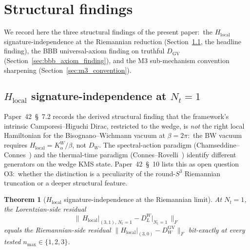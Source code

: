\documentclass[11pt,a4paper]{article}
\theoremstyle{plain}
\newtheorem{theorem}{Theorem}[section]
\theoremstyle{definition}
\newcommand{\nmax}{n_{\max}}
\newcommand{\Nt}{N_t}
\newcommand{\sthree}{S^{3}}
\newcommand{\Frob}[1]{\lVert #1 \rVert_{F}}
\newcommand{\DGV}{D_{\mathrm{GV}}}
\newcommand{\DL}{D_{L}}
\begin{document}
\section{Structural findings}\label{sec:structural_findings}

We record here the three structural findings of the present paper:\
the $H_{\mathrm{local}}$ signature-independence at the Riemannian
reduction (Section~\ref{sec:H_local_signature_independence}, the
headline finding), the BBB universal-axiom finding on truthful $\DGV$
(Section~\ref{sec:bbb_axiom_finding}), and the M3 sub-mechanism
convention sharpening
(Section~\ref{sec:m3_convention}).

\subsection{$H_{\mathrm{local}}$ signature-independence at $\Nt = 1$}
\label{sec:H_local_signature_independence}

Paper~42~\S~7.2 records the derived structural finding that the
framework's intrinsic Camporesi--Higuchi Dirac, restricted to the
wedge, is \emph{not} the right local Hamiltonian for the
Bisognano--Wichmann vacuum at $\beta = 2\pi$:\ the BW vacuum requires
$H_{\mathrm{local}} = K_\alpha^W / \beta$, not $D_W$. The
spectral-action paradigm
(Chamseddine--Connes~\cite{chamseddine_connes2010}) and the
thermal-time paradigm (Connes--Rovelli~\cite{connes_rovelli1994})
identify different generators on the wedge KMS state. Paper~42~\S~10
lists this as open question O3:\ whether the distinction is a
peculiarity of the round-$\sthree$ Riemannian truncation or a deeper
structural feature.

\begin{theorem}[$H_{\mathrm{local}}$ signature-independence at the
Riemannian limit]\label{thm:H_local_signature_independence}
At $\Nt = 1$, the Lorentzian-side residual
\[
   \Frob{\,H_{\mathrm{local}}\big|_{(3, 1),\, \Nt = 1}
         - \DL^W\big|_{\Nt = 1}\,}
\]
equals the Riemannian-side residual
$\Frob{H_{\mathrm{local}}|_{(3, 0)} - D_W^{\mathrm{GV}}}$ \emph{bit-exactly}
at every tested $\nmax \in \{1, 2, 3\}$.
\end{theorem}
\end{document}
